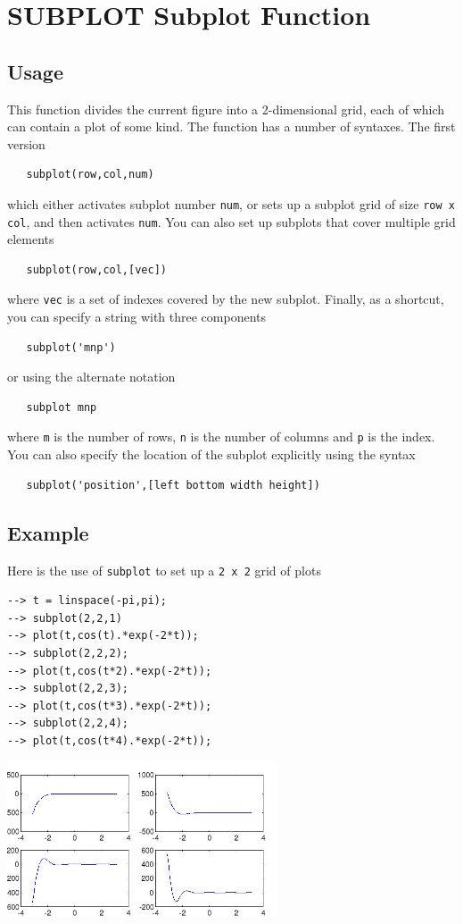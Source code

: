 \section{SUBPLOT Subplot Function}

\subsection{Usage}

This function divides the current figure into a 2-dimensional
grid, each of which can contain a plot of some kind.  The function
has a number of syntaxes.  The first version 
\begin{verbatim}
   subplot(row,col,num)
\end{verbatim}
which either activates subplot number \verb|num|, or 
sets up a subplot grid of size \verb|row x col|, and then
activates \verb|num|. You can also set up subplots that cover multiple
grid elements
\begin{verbatim}
   subplot(row,col,[vec])
\end{verbatim}
where \verb|vec| is a set of indexes covered by the new subplot.
Finally, as a shortcut, you can specify a string with three
components
\begin{verbatim}
   subplot('mnp')
\end{verbatim}
or using the alternate notation
\begin{verbatim}
   subplot mnp
\end{verbatim}
where \verb|m| is the number of rows, \verb|n| is the number of columns
and \verb|p| is the index.  You can also specify the location of the
subplot explicitly using the syntax
\begin{verbatim}
   subplot('position',[left bottom width height])
\end{verbatim}

\subsection{Example}

Here is the use of \verb|subplot| to set up a \verb|2 x 2| grid of plots
\begin{verbatim}
--> t = linspace(-pi,pi);
--> subplot(2,2,1)
--> plot(t,cos(t).*exp(-2*t));
--> subplot(2,2,2);
--> plot(t,cos(t*2).*exp(-2*t));
--> subplot(2,2,3);
--> plot(t,cos(t*3).*exp(-2*t));
--> subplot(2,2,4);
--> plot(t,cos(t*4).*exp(-2*t));
\end{verbatim}


\centerline{\includegraphics[width=8cm]{subplot1}}

